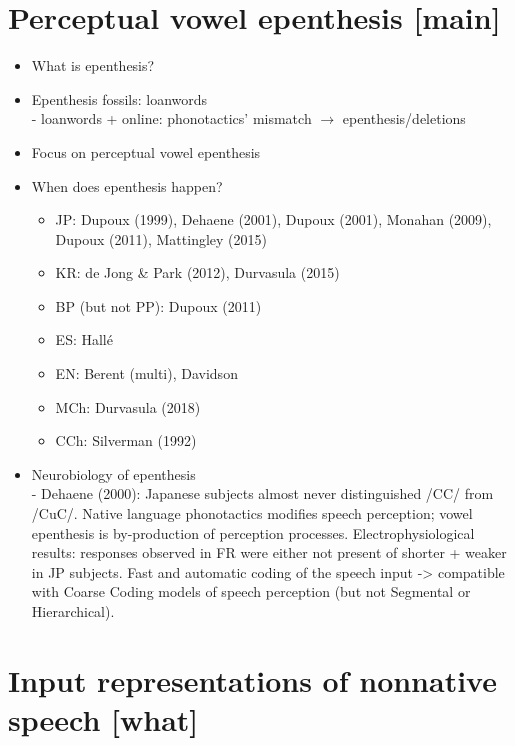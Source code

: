 \section{Perceptual vowel epenthesis [main]}

\begin{itemize}
\item What is epenthesis?
\item Epenthesis fossils: loanwords \\
  - loanwords + online: phonotactics' mismatch $\rightarrow$ epenthesis/deletions
\item Focus on perceptual vowel epenthesis
\item When does epenthesis happen?
  \begin{itemize}
  \item JP: Dupoux (1999), Dehaene (2001), Dupoux (2001), Monahan (2009), Dupoux (2011), Mattingley (2015)
  \item KR: de Jong \& Park (2012), Durvasula (2015) 
  \item BP (but not PP): Dupoux (2011)
  \item ES: Hallé
  \item EN: Berent (multi), Davidson
  \item MCh: Durvasula (2018)
  \item CCh: Silverman (1992)
  \end{itemize}
  
\item Neurobiology of epenthesis \\
  - Dehaene (2000): Japanese subjects almost never distinguished /CC/ from /CuC/. Native language phonotactics modifies speech perception; vowel epenthesis is by-production of perception processes. Electrophysiological results: responses observed in FR were either not present of shorter + weaker in JP subjects. Fast and automatic coding of the speech input -> compatible with Coarse Coding models of speech perception (but not Segmental or Hierarchical). 

\end{itemize}

\section{Input representations of nonnative speech [what]}

